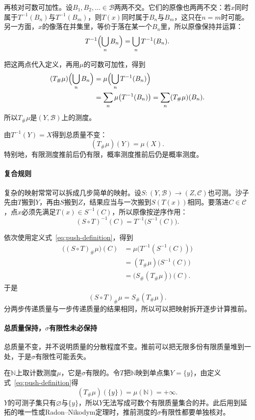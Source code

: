 再核对可数可加性。设$B_1,B_2,\ldots\in\mathcal B$两两不交。它们的原像也两两不交：若$x$同时属于$T^{-1}(B_n)$与$T^{-1}(B_m)$，则$T(x)$同时属于$B_n$与$B_m$，这只在$n=m$时可能。另一方面，$x$的像落在并集里，等价于落在某一个$B_n$里，所以原像保持并运算：
\[
T^{-1}\Bigl(\bigcup_nB_n\Bigr)=\bigcup_nT^{-1}(B_n).
\]

把这两点代入定义，再用$\mu$的可数可加性，得到
\[
\begin{aligned}
(T_\#\mu)\Bigl(\bigcup_nB_n\Bigr)&=\mu\Bigl(\bigcup_nT^{-1}(B_n)\Bigr)\\
&=\sum_n\mu\bigl(T^{-1}(B_n)\bigr)=\sum_n(T_\#\mu)(B_n).
\end{aligned}
\]
所以$T_\#\mu$是$(Y,\mathcal B)$上的测度。

由$T^{-1}(Y)=X$得到总质量不变：
\begin{equation}
(T_\#\mu)(Y)=\mu(X).
\label{eq:push-total-mass}
\end{equation}
特别地，有限测度推前后仍有限，概率测度推前后仍是概率测度。

\paragraph{复合规则}
复杂的映射常常可以拆成几步简单的映射。设$S:(Y,\mathcal B)\to(Z,\mathcal C)$也可测。沙子先由$T$搬到$Y$，再由$S$搬到$Z$，结果应当与一次搬到$S(T(x))$相同。要落进$C\in\mathcal C$，点$x$必须先满足$T(x)\in S^{-1}(C)$，所以原像按逆序作用：
\[
(S\circ T)^{-1}(C)=T^{-1}\bigl(S^{-1}(C)\bigr).
\]

依次使用定义式~\eqref{eq:push-definition}，得到
\[
\begin{aligned}
\bigl((S\circ T)_\#\mu\bigr)(C)&=\mu\bigl(T^{-1}(S^{-1}(C))\bigr)\\
&=(T_\#\mu)\bigl(S^{-1}(C)\bigr)\\
&=\bigl(S_\#(T_\#\mu)\bigr)(C).
\end{aligned}
\]
于是
\begin{equation}
(S\circ T)_\#\mu=S_\#(T_\#\mu).
\label{eq:push-composition}
\end{equation}
分两步传递质量与一步传递质量的结果相同，所以可以把映射拆开逐步计算推前。

\paragraph{总质量保持，$\sigma$有限性未必保持}
总质量不变，并不说明质量的分散程度不变。推前可以把无限多份有限质量堆到一处，于是$\sigma$有限性可能丢失。

在$\mathbb N$上取计数测度$\mu$，它是$\sigma$有限的。令$T$把$\mathbb N$映到单点集$Y=\{y\}$，由定义式~\eqref{eq:push-definition}得
\[
(T_\#\mu)(\{y\})=\mu(\mathbb N)=+\infty.
\]
$Y$的可测子集只有$\varnothing$与$\{y\}$，所以$Y$无法写成可数个有限质量集合的并。此后用到延拓的唯一性或Radon--Nikodym定理时，推前测度的$\sigma$有限性都要单独核对。

